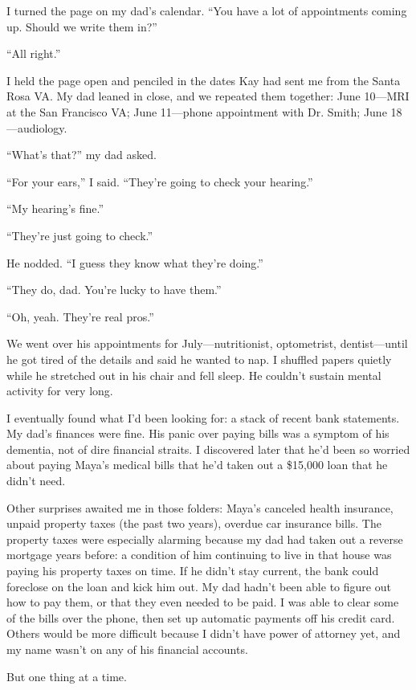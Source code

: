 \documentclass[12pt]{book}
\begin{document}
I turned the page on my dad's calendar. ``You have a lot of appointments coming up. Should we write them in?''

``All right.''

I held the page open and penciled in the dates Kay had sent me from the Santa Rosa VA. My dad leaned in close, and we repeated them together: June 10---MRI at the San Francisco VA; June 11---phone appointment with Dr. Smith; June 18---audiology.

``What's that?'' my dad asked.

``For your ears,'' I said. ``They're going to check your hearing.''

``My hearing's fine.''

``They're just going to check.''

He nodded. ``I guess they know what they're doing.''

``They do, dad. You're lucky to have them.''

``Oh, yeah. They're real pros.''

We went over his appointments for July---nutritionist, optometrist, dentist---until he got tired of the details and said he wanted to nap. I shuffled papers quietly while he stretched out in his chair and fell sleep. He couldn't sustain mental activity for very long.

I eventually found what I'd been looking for: a stack of recent bank statements. My dad's finances were fine. His panic over paying bills was a symptom of his dementia, not of dire financial straits. I discovered later that he'd been so worried about paying Maya's medical bills that he'd taken out a \$15,000 loan that he didn't need.

Other surprises awaited me in those folders: Maya's canceled health insurance, unpaid property taxes (the past two years), overdue car insurance bills. The property taxes were especially alarming because my dad had taken out a reverse mortgage years before: a condition of him continuing to live in that house was paying his property taxes on time. If he didn't stay current, the bank could foreclose on the loan and kick him out. My dad hadn't been able to figure out how to pay them, or that they even needed to be paid. I was able to clear some of the bills over the phone, then set up automatic payments off his credit card. Others would be more difficult because I didn't have power of attorney yet, and my name wasn't on any of his financial accounts.

But one thing at a time.
\end{document}
